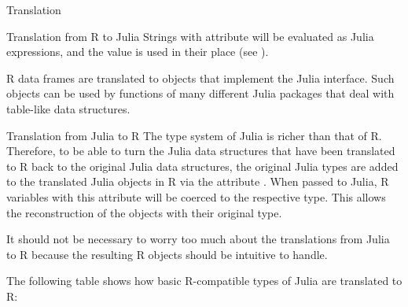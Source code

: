 \begin{Section}{Translation}
\begin{SubSection}{Translation from R to Julia}
Strings with attribute 
will be evaluated as Julia expressions,
and the value is used in their place (see ).

R data frames are translated to objects that implement the Julia
 interface.
Such objects can be used by functions of many different
Julia packages that deal with table-like data structures.

\end{SubSection}


%
\begin{SubSection}{Translation from Julia to R}
The type system of Julia is richer than that of R. Therefore, to be able to turn
the Julia data structures that have been translated to R back to the original Julia
data structures, the original Julia types are added to the translated Julia objects
in R via the attribute .
When passed to Julia, R variables with this
attribute will be coerced to the respective type.
This allows the reconstruction of the objects
with their original type.

It should not be necessary to worry too much
about the translations from Julia to R because the resulting R objects should be
intuitive to handle.

The following table shows how basic R-compatible types of Julia are translated to R:



\end{SubSection}
\end{Section}
